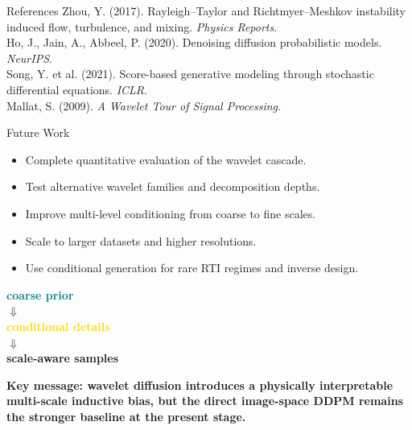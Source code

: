 \documentclass{article}
\newcommand{\PosterReferenceSize}{16pt}
\newcommand{\PosterReferenceLeading}{19pt}
\newcommand{\PosterHeadingSize}{31pt}
\newcommand{\PosterHeadingLeading}{37pt}
\newcommand{\reffont}{\fontsize{\PosterReferenceSize}{\PosterReferenceLeading}\selectfont}
\newcommand{\headfont}{\fontsize{\PosterHeadingSize}{\PosterHeadingLeading}\selectfont}
\newcommand{\badge}[2]{%
  \begingroup
  \setlength{\fboxsep}{5pt}%
  \colorbox{#1!12}{\textcolor{#1}{\bfseries #2}}%
  \endgroup
}
\begin{document}
\vspace{10px}
\begin{minipage}[t]{0.492\linewidth}
\begin{posterbox}[height=82mm,valign=top]{References}
  \reffont
  Zhou, Y. (2017). Rayleigh--Taylor and Richtmyer--Meshkov instability induced flow, turbulence, and mixing. \emph{Physics Reports}.\\
  Ho, J., Jain, A., Abbeel, P. (2020). Denoising diffusion probabilistic models. \emph{NeurIPS}.\\
  Song, Y. et al. (2021). Score-based generative modeling through stochastic differential equations. \emph{ICLR}.\\
  Mallat, S. (2009). \emph{A Wavelet Tour of Signal Processing}.
\end{posterbox}
\end{minipage}
\hfill
\begin{minipage}[t]{0.492\linewidth}
\begin{posterbox}[height=82mm,valign=top]{Future Work}
  \begin{minipage}[t]{0.58\linewidth}
    \begin{itemize}
      \item Complete quantitative evaluation of the wavelet cascade.
      \item Test alternative wavelet families and decomposition depths.
      \item Improve multi-level conditioning from coarse to fine scales.
      \item Scale to larger datasets and higher resolutions.
      \item Use conditional generation for rare RTI regimes and inverse design.
    \end{itemize}
  \end{minipage}
  \hfill
  \begin{minipage}[t]{0.38\linewidth}
    \centering
    \badge{teal}{coarse prior}\\[0.6em]
    $\Downarrow$\\[0.3em]
    \badge{gold}{conditional details}\\[0.6em]
    $\Downarrow$\\[0.3em]
    \badge{ceaRed}{scale-aware samples}
  \end{minipage}
\end{posterbox}
\end{minipage}

\vspace{10px}
\begin{tcolorbox}[
  width=\linewidth,
  colback=ceaRed,
  colframe=ceaRed,
  boxrule=2.4pt,
  arc=0pt,
  left=18pt,
  right=18pt,
  top=10pt,
  bottom=10pt,
  before skip=0pt,
  after skip=0pt
]
  {\headfont\bfseries\color{white} Key message: wavelet diffusion introduces a physically interpretable multi-scale inductive bias, but the direct image-space DDPM remains the stronger baseline at the present stage.}
\end{tcolorbox}
\end{document}
